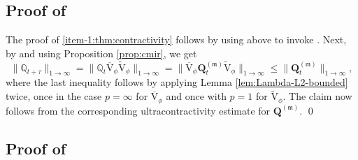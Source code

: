 \documentclass[JEP,XML,SOM,Unicode]{cedram}
\theoremstyle{plain}
\theoremstyle{definition}
\newcommand{\J}{\mathds{Q}}
\newcommand{\m}{\mathfrak{m}}
\newcommand{\Q}[1][\mo]{\mathbf{Q}^{({#1})}}
\let\mo\mu
\begin{document}
\subsection{Proof of }

The proof of \eqref{item-1:thm:contractivity} follows by using  above to invoke \cite[Th.\,8]{Patie-Miclo}. Next, by  and using Proposition \ref{prop:cmir}, we get
\begin{equation*}
\|\J_{t+\tau}\|_{1\to\infty} = \|\J_t \overline{\mathrm{V}}_\phi \widetilde{\mathrm{V}}_\phi\|_{1\to\infty} = \|\overline{\mathrm{V}}_\phi \Q[\m]_t \widetilde{\mathrm{V}}_\phi\|_{1\to\infty} \leq \|\Q[\m]_t\|_{1\to\infty},
\end{equation*}
where the last inequality follows by applying Lemma \ref{lem:Lambda-L2-bounded} twice, once in the case \hbox{$p=\infty$} for $\overline{\mathrm{V}}_\phi$ and once with $p=1$ for $\widetilde{\mathrm{V}}_\phi$. The claim now follows from the corresponding ultracontractivity estimate for $\Q[\m]$. \qed

\subsection{Proof of }
\end{document}
